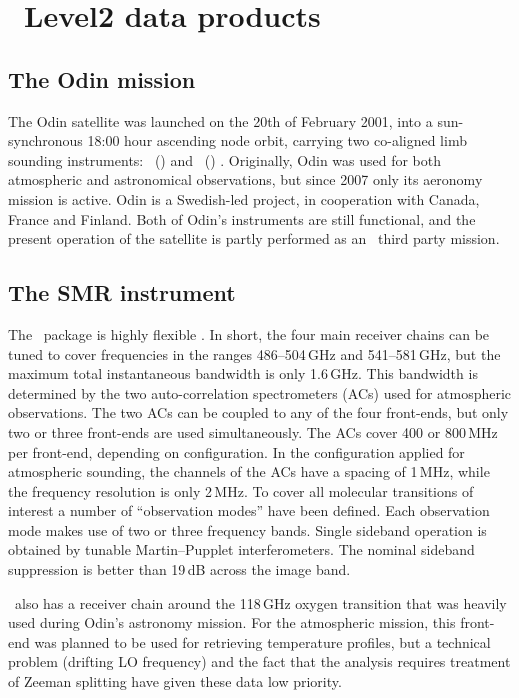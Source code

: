 \chapter{\smr\ Level2 data products}

\section{The Odin mission}
\label{sec:odin}
%

The Odin satellite was launched on the 20th of February 2001, into a sun-synchronous
18:00 hour ascending node orbit, carrying two co-aligned limb sounding
instruments: \OSIRIS\ (\OSIRISlong) and
\SMR\ (\SMRlong) \citep{murtagh:anove:02}. 
Originally, Odin was used for both
atmospheric and astronomical observations, but since 2007 only its aeronomy
mission is active. Odin is a Swedish-led project, in cooperation with Canada,
France and Finland. Both of Odin's instruments are still functional, and the
present operation of the satellite is partly performed as an \ESA\ third party
mission.

\section{The SMR instrument}

The \smr\ package is highly flexible \citep{frisk:theod:03}. 
In short, the four main receiver chains
can be tuned to cover frequencies in the ranges 486--504\,GHz and
541--581\,GHz, but the maximum total instantaneous bandwidth is only
1.6\,GHz. This bandwidth is determined by the two auto-correlation
spectrometers (ACs) used for atmospheric observations. The two ACs can be
coupled to any of the four front-ends, but only two or three front-ends are
used simultaneously. The ACs cover 400 or 800\,MHz per front-end, depending on
configuration. In the configuration applied for atmospheric sounding, the
channels of the ACs have a spacing of 1\,MHz, while the frequency resolution is
only 2\,MHz.
To cover all molecular transitions
of interest a number of ``observation modes'' have been defined. Each
observation mode makes use of two or three frequency bands. Single sideband
operation is obtained by tunable Martin--Pupplet interferometers. The nominal
sideband suppression is better than 19\,dB across the image band.

\smr\ also has a receiver chain around the 118\,GHz oxygen transition that was
heavily used during Odin's astronomy mission. For the atmospheric mission, this
front-end was planned to be used for retrieving temperature profiles, but a
technical problem (drifting LO frequency) and the fact that the analysis
requires treatment of Zeeman splitting have given these data low priority. 

